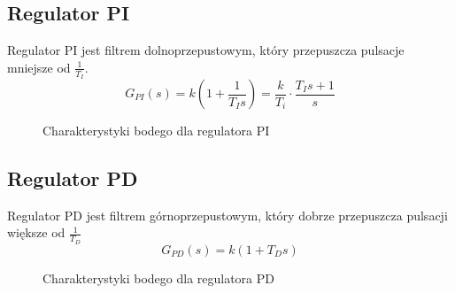 \documentclass[a4paper, 10pt]{article}
\begin{document}
		\subsection{Regulator PI}
			Regulator PI jest filtrem dolnoprzepustowym, który przepuszcza pulsacje mniejsze od $\frac{1}{T_I}$.
			$$
				G_{PI}(s) = k\left(1 + \frac{1}{T_Is}\right) = \frac{k}{T_i} \cdot\frac{T_Is + 1}{s}
			$$
			\begin{figure}[H]
				\centering
				\def \svgwidth{0.7\columnwidth}
				
				\caption{Charakterystyki bodego dla regulatora PI}
			\end{figure}\noindent
		\subsection{Regulator PD}
			Regulator PD jest filtrem górnoprzepustowym, który dobrze przepuszcza pulsacji większe od $ \frac{1}{T_D}$
			$$
				G_{PD}(s) = k\left(1 + T_Ds\right)
			$$
			\begin{figure}[H]
				\centering
				\def \svgwidth{0.7\columnwidth}
				
				\caption{Charakterystyki bodego dla regulatora PD}
			\end{figure}\noindent
\end{document}
